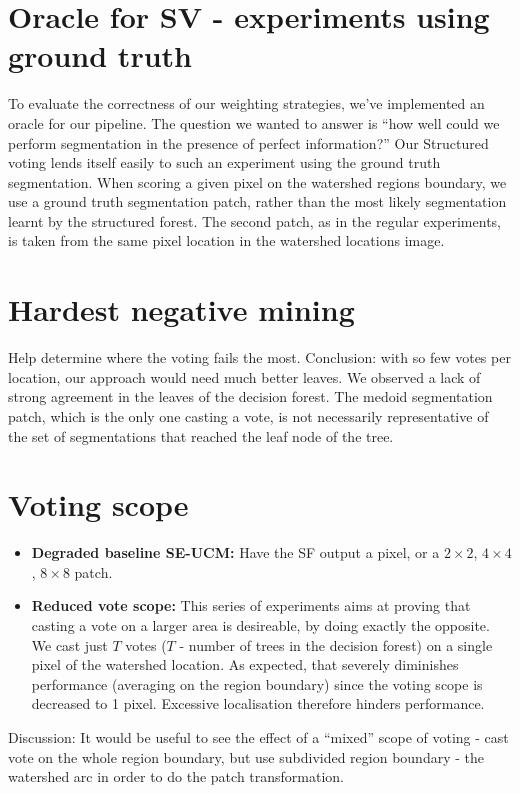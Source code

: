 \section[Oracle for Structured voting]{Oracle for SV - experiments using ground truth}
\label{sec:ch5-oracle}
To evaluate the correctness of our weighting strategies, we've implemented an oracle for our pipeline. The question we wanted to answer is ``how well could we perform segmentation in the presence of perfect information?'' Our Structured voting lends itself easily to such an experiment using the ground truth segmentation. 
When scoring a given pixel on the watershed regions boundary, we use a ground truth segmentation patch, rather than the most likely segmentation learnt by the structured forest. The second patch, as in the regular experiments, is taken from the same pixel location in the watershed locations image.

\section{Hardest negative mining}
Help determine where the voting fails the most. Conclusion: with so few votes per location, our approach would need much better leaves. We observed a lack of strong agreement in the leaves of the decision forest. The medoid segmentation patch, which is the only one casting a vote, is not necessarily representative of the set of segmentations that reached the leaf node of the tree.

\section{Voting scope}
  \begin{itemize}
    \item{\bf Degraded baseline SE-UCM:} Have the SF output a pixel, or a $2\times2$, $4\times4$, $8\times8$ patch.
    \item{\bf Reduced vote scope:} This series of experiments aims at proving that casting a vote on a larger area is desireable, by doing exactly the opposite. We cast just $T$ votes ($T$ - number of trees in the decision forest) on a single pixel of the watershed location. As expected, that severely diminishes performance (\wrt averaging on the region boundary) since the voting scope is decreased to 1 pixel. Excessive localisation therefore hinders performance.
  \end{itemize}
Discussion: It would be useful to see the effect of a ``mixed'' scope of voting - cast vote on the whole region boundary, but use subdivided region boundary - the watershed arc in order to do the patch transformation.

